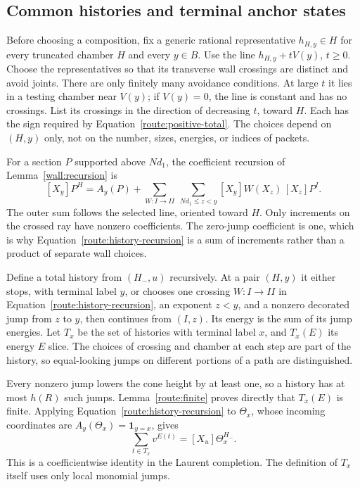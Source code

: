 \subsection{Common histories and terminal anchor states}
\label{route:histories}

Before choosing a composition, fix a generic rational representative
$h_{H,y}\in H$ for every truncated chamber $H$ and every $y\in B$.
Use the line $h_{H,y}+tV(y)$, $t\geq0$.  Choose the representatives
so that its transverse wall crossings are distinct and avoid joints.
There are only finitely many avoidance conditions.  At large $t$ it
lies in a testing chamber near $V(y)$; if $V(y)=0$, the line is
constant and has no crossings.  List its crossings in the direction
of decreasing $t$, toward $H$.  Each has the sign required by
Equation~\eqref{route:positive-total}.  The choices depend on $(H,y)$ only,
not on the number, sizes, energies, or indices of packets.

For a section $P$ supported above $Nd_1$, the coefficient recursion
of Lemma~\ref{wall:recursion} is
\begin{equation}
 \label{route:history-recursion}
 [X_y]P^H=A_y(P)+
 \sum_{W:I\to II}\ \sum_{Nd_1\leq z<y}
       [X_y]W(X_z)\,[X_z]P^I.
\end{equation}
The outer sum follows the selected line, oriented toward $H$.
Only increments on the crossed ray have nonzero coefficients.
The zero-jump coefficient is one, which is why
Equation~\eqref{route:history-recursion} is a sum of increments rather than
a product of separate wall choices.

Define a total history from $(H_-,u)$ recursively.  At a pair $(H,y)$
it either stops, with terminal label $y$, or chooses one crossing
$W:I\to II$ in Equation~\eqref{route:history-recursion}, an exponent $z<y$,
and a nonzero decorated jump from $z$ to $y$, then continues from
$(I,z)$.  Its energy is the sum of its jump energies.  Let $T_x$ be
the set of histories with terminal label $x$, and $T_x(E)$ its energy
$E$ slice.  The choices of crossing and chamber at each step are
part of the history, so equal-looking jumps on different portions
of a path are distinguished.

Every nonzero jump lowers the cone height by at least one, so a
history has at most $h(R)$ such jumps.  Lemma~\ref{route:finite}
proves directly that $T_x(E)$ is finite.  Applying
Equation~\eqref{route:history-recursion} to $\Theta_x$, whose incoming
coordinates are $A_y(\Theta_x)=\mathbf1_{y=x}$, gives
\begin{equation}
 \label{route:history-series}
 \sum_{t\in T_x}v^{E(t)}=[X_u]\Theta_x^{H_-}.
\end{equation}
This is a coefficientwise identity in the Laurent completion.
The definition of $T_x$ itself uses only local monomial jumps.

